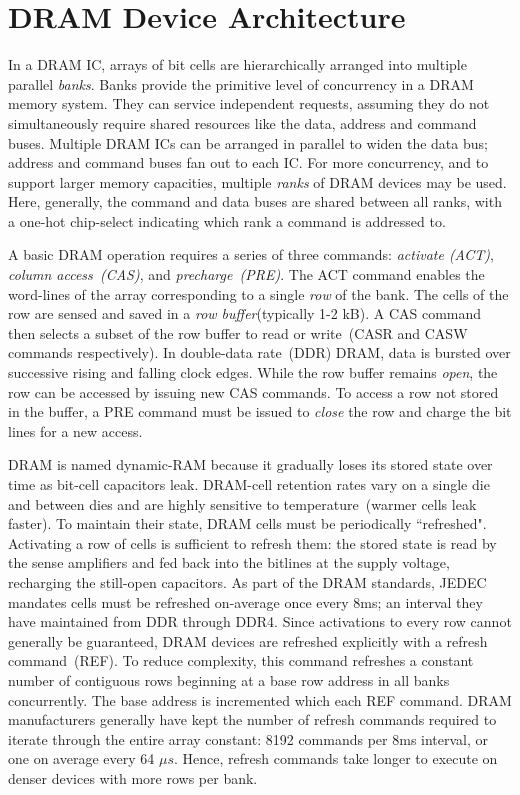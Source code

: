 \section{DRAM Device Architecture}\label{sec:dram-arch} In a DRAM IC, arrays of
bit cells are hierarchically arranged into multiple parallel \emph{banks}.
Banks provide the primitive level of concurrency in a DRAM memory system. They
can service independent requests, assuming they do not simultaneously require
shared resources like the data, address and command buses.  Multiple DRAM ICs
can be arranged in parallel to widen the data bus; address and command buses
fan out to each IC. For more concurrency, and to support larger memory
capacities, multiple \emph{ranks} of DRAM devices may be used. Here, generally,
the command and data buses are shared between all ranks, with a one-hot
chip-select indicating which rank a command is addressed to.

A basic DRAM operation requires a series of three commands: \emph{activate
(ACT)}, \emph{column access~(CAS)}, and \emph{precharge~(PRE)}. The ACT command
enables the word-lines of the array corresponding to a single \emph{row} of the
bank. The cells of the row are sensed and saved in a \emph{row
buffer}(typically 1-2 kB). A CAS command then selects a subset of the row
buffer to read or write~(CASR and CASW commands respectively). In double-data
rate~(DDR) DRAM, data is bursted over successive rising and falling clock
edges.  While the row buffer remains \emph{open}, the row can be accessed by
issuing new CAS commands. To access a row not stored in the buffer, a PRE
command must be issued to \emph{close} the row and charge the bit lines for a
new access.

DRAM is named dynamic-RAM because it gradually loses its stored state over time
as bit-cell capacitors leak. DRAM-cell retention rates vary on a single die and
between dies and are highly sensitive to temperature~(warmer cells leak
faster). To maintain their state, DRAM cells must be periodically ``refreshed".
Activating a row of cells is sufficient to refresh them: the stored state is
read by the sense amplifiers and fed back into the bitlines at the supply
voltage, recharging the still-open capacitors.  As part of the DRAM standards,
JEDEC mandates cells must be refreshed on-average once every 8ms; an interval
they have maintained from DDR through DDR4. Since activations to every row
cannot generally be guaranteed, DRAM devices are refreshed explicitly with
a refresh command~(REF). To reduce complexity, this command refreshes a constant
number of contiguous rows beginning at a base row address in all banks
concurrently. The base address is incremented which each REF command. DRAM manufacturers generally
have kept the number of refresh commands required to iterate through the entire
array constant: 8192 commands per 8ms interval, or one on average every 64 $\mu s$.
Hence, refresh commands take longer to execute on denser devices with more rows
per bank.

